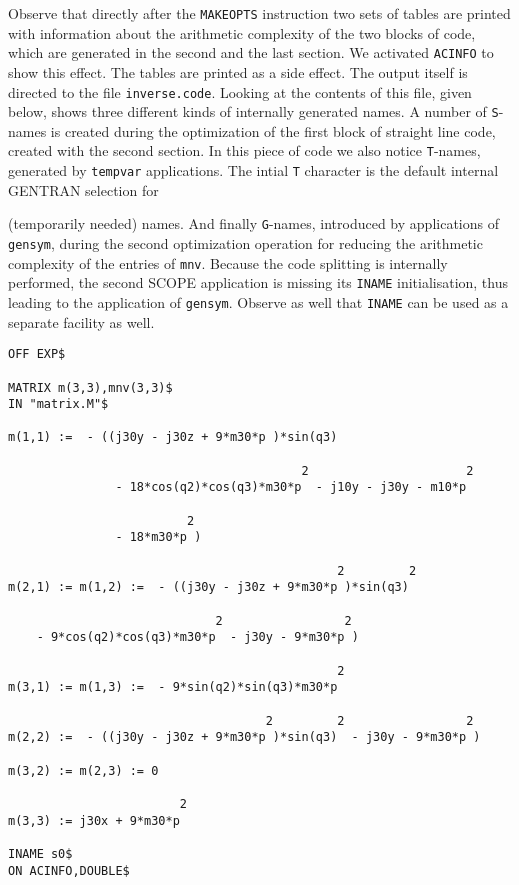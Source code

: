 Observe that directly after the {\tt MAKEOPTS} instruction two sets of tables
are printed with information about the arithmetic complexity of the two blocks
of code, which are generated in the second and the last section.  We
activated {\tt ACINFO} to show this effect.  The tables are printed as
a side effect. The output itself is directed to the file {\tt inverse.code}.
Looking at the contents of this file, given below, shows three different
kinds of internally generated names. A number of {\tt S}-names is created
during the optimization of the first block of straight line code, created with
the second section. In this piece of code we also notice {\tt T}-names,
generated by {\tt tempvar} applications. The intial {\tt T} character is the
default internal GENTRAN selection for {(temporarily needed) names.
And finally {\tt G}-names, introduced by
applications of {\tt gensym}, during the second optimization operation for
reducing the arithmetic complexity of the entries of {\tt mnv}. Because the
code splitting is internally performed, the second SCOPE application
is missing its {\tt INAME} initialisation, thus leading to the application of
{\tt gensym}. Observe as well that {\tt INAME} can be used as a separate
facility as well.
{\small
\begin{verbatim}
OFF EXP$

MATRIX m(3,3),mnv(3,3)$
IN "matrix.M"$

m(1,1) :=  - ((j30y - j30z + 9*m30*p )*sin(q3)

                                         2                      2
               - 18*cos(q2)*cos(q3)*m30*p  - j10y - j30y - m10*p

                         2
               - 18*m30*p )

                                              2         2
m(2,1) := m(1,2) :=  - ((j30y - j30z + 9*m30*p )*sin(q3)

                             2                 2
    - 9*cos(q2)*cos(q3)*m30*p  - j30y - 9*m30*p )

                                              2
m(3,1) := m(1,3) :=  - 9*sin(q2)*sin(q3)*m30*p

                                    2         2                 2
m(2,2) :=  - ((j30y - j30z + 9*m30*p )*sin(q3)  - j30y - 9*m30*p )

m(3,2) := m(2,3) := 0

                        2
m(3,3) := j30x + 9*m30*p

INAME s0$
ON ACINFO,DOUBLE$


\end{verbatim}}}
